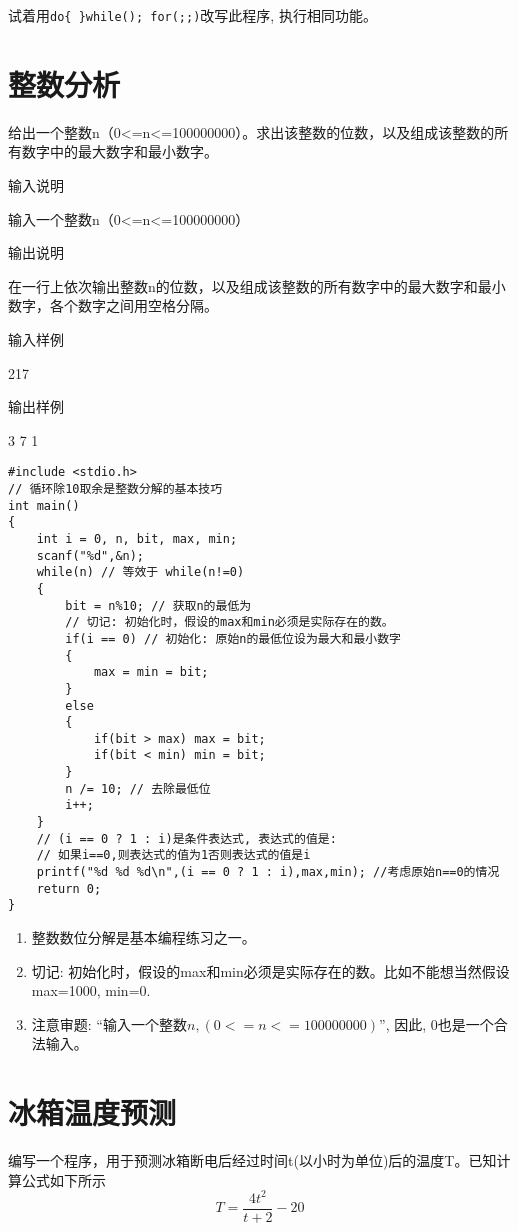 \begin{note}
	试着用\lstinline|do{ }while(); for(;;)|改写此程序, 执行相同功能。
\end{note}

\section{整数分析}
给出一个整数n（0<=n<=100000000）。求出该整数的位数，以及组成该整数的所有数字中的最大数字和最小数字。

输入说明
	
输入一个整数n（0<=n<=100000000）

输出说明
	
在一行上依次输出整数n的位数，以及组成该整数的所有数字中的最大数字和最小数字，各个数字之间用空格分隔。

输入样例
	
217

输出样例
	
3 7 1

\begin{lstlisting}
#include <stdio.h>
// 循环除10取余是整数分解的基本技巧
int main()
{
	int i = 0, n, bit, max, min;
	scanf("%d",&n);
	while(n) // 等效于 while(n!=0)
	{
		bit = n%10; // 获取n的最低为
		// 切记: 初始化时，假设的max和min必须是实际存在的数。
		if(i == 0) // 初始化: 原始n的最低位设为最大和最小数字
		{
			max = min = bit;
		}  
		else
		{
			if(bit > max) max = bit;
			if(bit < min) min = bit;
		}
		n /= 10; // 去除最低位
		i++;
	} 
	// (i == 0 ? 1 : i)是条件表达式, 表达式的值是:
	// 如果i==0,则表达式的值为1否则表达式的值是i
	printf("%d %d %d\n",(i == 0 ? 1 : i),max,min); //考虑原始n==0的情况 
	return 0;
} 
\end{lstlisting}

\begin{note}[知识点]
  \begin{enumerate}
  	\item 整数数位分解是基本编程练习之一。
  	\item 切记: 初始化时，假设的max和min必须是实际存在的数。比如不能想当然假设max=1000, min=0.
  	\item 注意审题: ``输入一个整数$n,(0<=n<=100000000)$'', 因此, 0也是一个合法输入。
  \end{enumerate}
  
\end{note}

\section{冰箱温度预测}
编写一个程序，用于预测冰箱断电后经过时间t(以小时为单位)后的温度T。已知计算公式如下所示
\[ T=\frac{4t^2}{t+2}-20 \]

